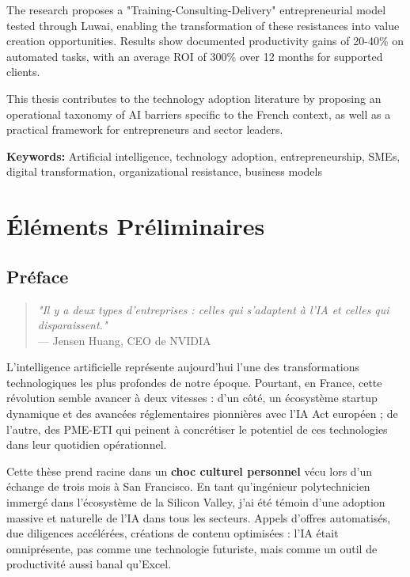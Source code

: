 \documentclass[12pt,a4paper]{report}
\begin{document}
The research proposes a "Training-Consulting-Delivery" entrepreneurial model tested through Luwai, enabling the transformation of these resistances into value creation opportunities. Results show documented productivity gains of 20-40\% on automated tasks, with an average ROI of 300\% over 12 months for supported clients.

This thesis contributes to the technology adoption literature by proposing an operational taxonomy of AI barriers specific to the French context, as well as a practical framework for entrepreneurs and sector leaders.

\textbf{Keywords:} Artificial intelligence, technology adoption, entrepreneurship, SMEs, digital transformation, organizational resistance, business models

\tableofcontents
\listoffigures
\listoftables

\newpage
{}

\part{Éléments Préliminaires}

\chapter*{Préface}

\begin{quote}
\textit{"Il y a deux types d'entreprises : celles qui s'adaptent à l'IA et celles qui disparaissent."} \\
--- Jensen Huang, CEO de NVIDIA
\end{quote}

L'intelligence artificielle représente aujourd'hui l'une des transformations technologiques les plus profondes de notre époque. Pourtant, en France, cette révolution semble avancer à deux vitesses : d'un côté, un écosystème startup dynamique et des avancées réglementaires pionnières avec l'IA Act européen ; de l'autre, des PME-ETI qui peinent à concrétiser le potentiel de ces technologies dans leur quotidien opérationnel.

Cette thèse prend racine dans un \textbf{choc culturel personnel} vécu lors d'un échange de trois mois à San Francisco. En tant qu'ingénieur polytechnicien immergé dans l'écosystème de la Silicon Valley, j'ai été témoin d'une adoption massive et naturelle de l'IA dans tous les secteurs. Appels d'offres automatisés, due diligences accélérées, créations de contenu optimisées : l'IA était omniprésente, pas comme une technologie futuriste, mais comme un outil de productivité aussi banal qu'Excel.
\end{document}
